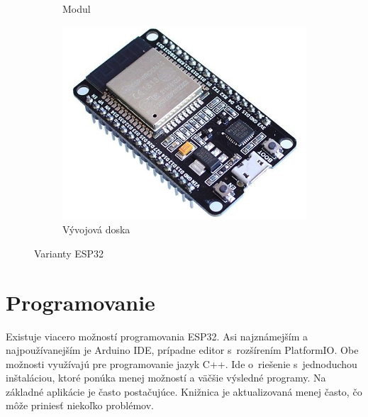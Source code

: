 \begin{figure}[ht]
\begin{subfigure}{.3\textwidth}
      \caption{Modul\footnotemark[3]}
      \label{fig:esp32_module}
    \end{subfigure}
    \begin{subfigure}{.3\textwidth}
      \centering
      \includegraphics[width=.8\linewidth]{obrazky-figures/esp-dev.png}
      \caption{Vývojová doska\footnotemark[4]}
      \label{fig:esp32_dev}
    \end{subfigure}
    \caption{Varianty ESP32}
    \label{fig:esp32_varianty}
\end{figure}


\section{Programovanie}

Existuje viacero možností programovania ESP32. Asi najznámejším a najpoužívanejším je Arduino IDE, prípadne editor s~rozšírením PlatformIO. Obe možnosti využívajú pre programovanie jazyk C++. Ide o~riešenie s~jednoduchou inštaláciou, ktoré ponúka menej možností a väčšie výsledné programy. Na základné aplikácie je často postačujúce. Knižnica je aktualizovaná menej často, čo môže priniesť niekoľko problémov.


